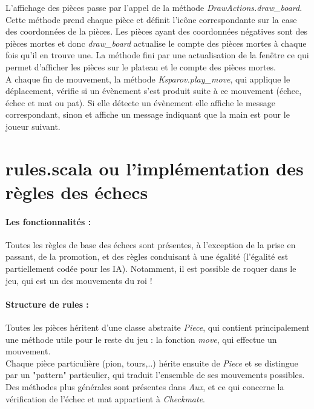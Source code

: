 \documentclass[a4paper]{article}
\begin{document}
L'affichage des pièces passe par l'appel de la méthode \textit{DrawActions.draw\_board}. Cette méthode prend chaque pièce et définit l'icône correspondante sur la case des coordonnées de la pièces. Les pièces ayant des coordonnées négatives sont des pièces mortes et donc \textit{draw\_board} actualise le compte des pièces mortes à chaque fois qu'il en trouve une. La méthode fini par une actualisation de la fenêtre ce qui permet d'afficher les pièces sur le plateau et le compte des pièces mortes. \\

A chaque fin de mouvement, la méthode \textit{Ksparov.play\_move}, qui applique le déplacement, vérifie si un évènement s'est produit suite à ce mouvement (échec, échec et mat ou pat). Si elle détecte un évènement elle affiche le message correspondant, sinon et affiche un message indiquant que la main est pour le joueur suivant.

\section{rules.scala ou l'implémentation des règles des échecs}

\paragraph{Les fonctionnalités :} Toutes les règles de base des échecs sont présentes, à l'exception de la prise en passant, de la promotion, et des règles conduisant à une égalité (l'égalité est partiellement codée pour les IA). Notamment, il est possible de roquer dans le jeu, qui est un des mouvements du roi !

\paragraph{Structure de rules :} Toutes les pièces héritent d'une classe abstraite \textit{Piece}, qui contient principalement une méthode utile pour le reste du jeu : la fonction \textit{move}, qui effectue un mouvement. \\
Chaque pièce particulière (pion, tours,..) hérite ensuite de \textit{Piece} et se distingue par un "pattern" particulier, qui traduit l'ensemble de ses mouvements possibles. \\

Des méthodes plus générales sont présentes dans \textit{Aux}, et ce qui concerne la vérification de l'échec et mat appartient à \textit{Checkmate}.
\end{document}
